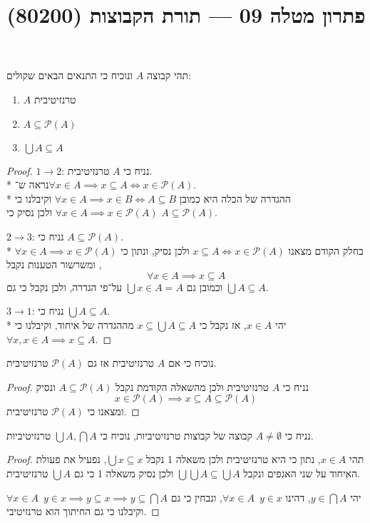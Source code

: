 
\title{פתרון מטלה 09 --- תורת הקבוצות (80200)}

\DeclareMathOperator\dom{dom}
\DeclareMathOperator\add{Add}
\DeclareMathOperator\mult{Mult}

\maketitle
\maketitleprint{}

\Question{}
תהי קבוצה $A$ ונוכיח כי התנאים הבאים שקולים:
\begin{enumerate}
	\item $A$ טרנזיטיבית
	\item $A \subseteq \mathcal{P}(A)$
	\item $\bigcup A \subseteq A$
\end{enumerate}
\begin{proof}
	$1 \to 2$:
	נניח כי $A$ טרנזיטיבית. \\*
	נראה ש־$\forall x \in A \implies x \subseteq A \iff x \in \mathcal{P}(A)$. \\*
	ההגדרה של הכלה היא כמובן $\forall x \in A \implies x \in B \iff A \subseteq B$ וקיבלנו כי $\forall x \in A \implies x \in \mathcal{P}(A)$ ולכן נסיק כי $A \subseteq \mathcal{P}(A)$.

	$2 \to 3$:
	נניח כי $A \subseteq \mathcal{P}(A)$. \\*
	בחלק הקודם מצאנו $x \subseteq A \iff x \in \mathcal{P}(A)$ ולכן נסיק,
	ונתון כי $\forall x \in A \implies x \in \mathcal{P}(A)$, ומשרשור הטענות נקבל
	\[
		\forall x \in A \implies x \subseteq A
	\]
	וכמובן גם $\bigcup x \in A = A$ על־פי הגדרה, ולכן נקבל כי גם $\bigcup A \subseteq A$.

	$3 \to 1$:
	נניח כי $\bigcup A \subseteq A$. \\*
	יהי $x \in A$, אז נקבל כי $x \subseteq \bigcup A \subseteq A$ מההגדרה של איחוד, וקיבלנו כי $\forall x, x \in A \implies x \subseteq A$.
\end{proof}

\Question{}
\Subquestion{}
נוכיח כי אם $A$ טרנזיטיבית אז גם $\mathcal{P}(A)$ טרנזיטיבית.
\begin{proof}
	נניח כי $A$ טרנזיטיבית ולכן מהשאלה הקודמת נקבל $A \subseteq \mathcal{P}(A)$ ונסיק
	\[
		x \in \mathcal{P}(A) \implies x \subseteq A \subseteq \mathcal{P}(A)
	\]
	ומצאנו כי $\mathcal{P}(A)$ טרנזיטיבית.
\end{proof}

\Subquestion{}
נניח כי $A \ne \emptyset$ קבוצה של קבוצות טרנזיטיביות, נוכיח כי $\bigcup A, \bigcap A$ טרנזיטיביות.
\begin{proof}
	תהי $x \in A$, נתון כי היא טרנזיטיבית ולכן משאלה 1 נקבל $\bigcup x \subseteq x$, נפעיל את פעולת האיחוד על שני האגפים ונקבל $\bigcup \bigcup A \subseteq \bigcup A$ ולכן נסיק משאלה 1 כי גם $\bigcup A$ טרנזיטיבית.

	יהי $y \in \bigcap A$, דהינו $\forall x \in A\enspace y \in x$, ונבחין כי גם $\forall x \in A \enspace y \in x \implies y \subseteq x \implies y \subseteq \bigcap A$ וקיבלנו כי גם החיתוך הוא טרנזיטיבי.
\end{proof}

